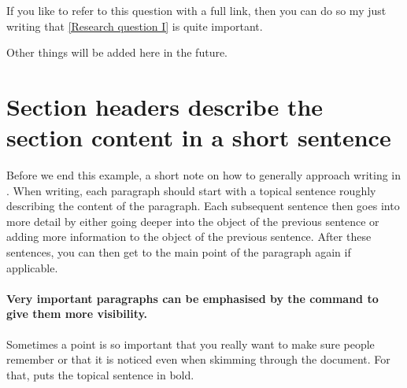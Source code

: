 \documentclass[hidelinks]{aquila-doc}
\begin{document}
{    

    \begin{flushright}

    \end{flushright}
    If you like to refer to this question with a full link, then you can do so my just writing that \ref{Research question I} is quite important.

    Other things will be added here in the future.

    \section{Section headers describe the section content in a short sentence}

    Before we end this example, a short note on how to generally approach writing in \aquila.
    When writing, each paragraph should start with a topical sentence roughly describing the content of the paragraph.
    Each subsequent sentence then goes into more detail by either going deeper into the object of the previous sentence or adding more information to the object of the previous sentence.
    After these sentences, you can then get to the main point of the paragraph again if applicable.

    \paragraph{Very important paragraphs can be emphasised by the  command to give them more visibility.}
    Sometimes a point is so important that you really want to make sure people remember or that it is noticed even when skimming through the document.
    For that,  puts the topical sentence in bold.
}

\newpage

\printbibliography
% 

\newpage
\appendix

\label{app:test}


% 
\end{document}
